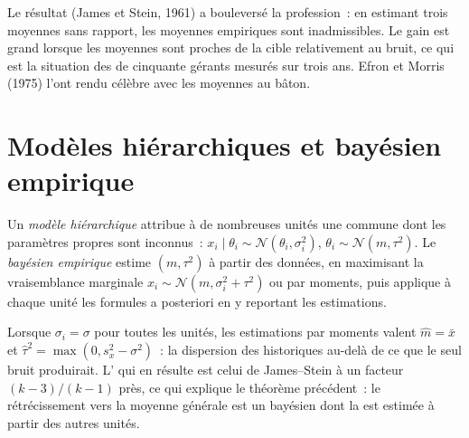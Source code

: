 Le résultat (James et Stein, 1961) a bouleversé la profession~: en estimant trois moyennes sans rapport, les moyennes empiriques sont inadmissibles. Le gain
est grand lorsque les moyennes sont proches de la cible relativement au bruit, ce qui est la situation des  de cinquante gérants mesurés
sur trois ans. Efron et Morris (1975) l'ont rendu célèbre avec les moyennes au bâton.

\section{Modèles hiérarchiques et bayésien empirique}

\begin{definition}\label{def:qm:bayesian-methods:hier}
Un \emph{modèle hiérarchique} attribue à de nombreuses unités une  commune dont les paramètres propres sont
inconnus~: $x_i \mid \theta_i \sim \mathcal N(\theta_i, \sigma_i^2)$, $\theta_i \sim \mathcal N(m, \tau^2)$. Le \emph{bayésien
empirique} estime $(m, \tau^2)$ à partir des données, en maximisant la vraisemblance marginale $x_i \sim \mathcal N(m, \sigma_i^2 +
\tau^2)$ ou par moments, puis applique à chaque unité les formules a posteriori en y reportant les estimations.
\end{definition}

Lorsque $\sigma_i = \sigma$ pour toutes les unités, les estimations par moments valent $\hat m = \bar x$ et $\hat\tau^2 = \max(0, s_x^2 - \sigma^2)$~: la dispersion des
historiques au-delà de ce que le seul bruit produirait. L' qui en résulte est celui de James--Stein à un facteur $(k - 3)/(k - 1)$ près, ce qui explique
le théorème précédent~: le rétrécissement vers la moyenne générale est un  bayésien dont la  est estimée à partir des autres unités.

